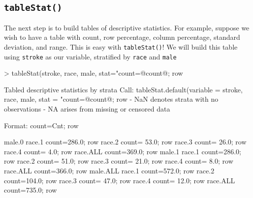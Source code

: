 \documentclass{article}
\begin{document}
\subsection{\texttt{tableStat()}}
The next step is to build tables of descriptive statistics. For example, suppose we wish to have a table with count, row percentage, column percentage, standard deviation, and range. This is easy with \texttt{tableStat()}! We will build this table using \texttt{stroke} as our variable, stratified by \texttt{race} and \texttt{male}
\begin{Schunk}
\begin{Sinput}
> tableStat(stroke, race, male, stat="count=@count@; row%
\end{Sinput}
\begin{Soutput}
Tabled descriptive statistics by strata
Call:
      tableStat.default(variable = stroke, race, male, stat = "count=@count@; row%
            - NaN denotes strata with no observations
            - NA arises from missing or censored data

Format:  count=Cnt; row%

         male.0                                                              
race.1   count=286.0; row%
race.2   count= 53.0; row%
race.3   count= 26.0; row%
race.4   count=  4.0; row%
race.ALL count=369.0; row%
         male.1                                                              
race.1   count=286.0; row%
race.2   count= 51.0; row%
race.3   count= 21.0; row%
race.4   count=  8.0; row%
race.ALL count=366.0; row%
         male.ALL                                                            
race.1   count=572.0; row%
race.2   count=104.0; row%
race.3   count= 47.0; row%
race.4   count= 12.0; row%
race.ALL count=735.0; row%
\end{Soutput}
\end{Schunk}
\end{document}
